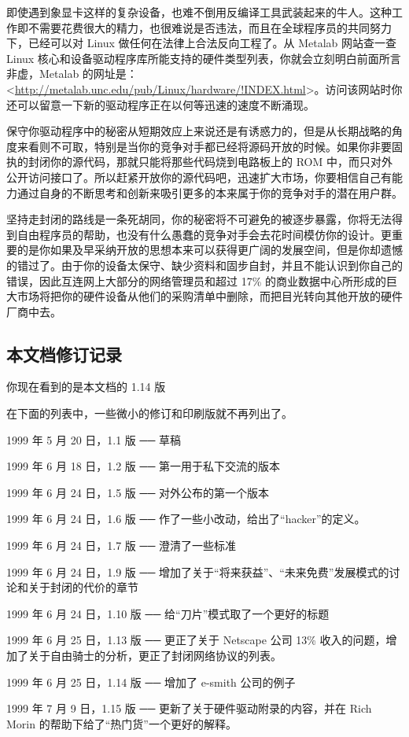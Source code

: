 即使遇到象显卡这样的复杂设备，也难不倒用反编译工具武装起来的牛人。这种工作即不需要花费很大的精力，也很难说是否违法，而且在全球程序员的共同努力下，已经可以对 Linux 做任何在法律上合法反向工程了。从 Metalab 网站查一查 Linux 核心和设备驱动程序库所能支持的硬件类型列表，你就会立刻明白前面所言非虚，Metalab 的网址是： <\url{http://metalab.unc.edu/pub/Linux/hardware/!INDEX.html}>。访问该网站时你还可以留意一下新的驱动程序正在以何等迅速的速度不断涌现。


保守你驱动程序中的秘密从短期效应上来说还是有诱惑力的，但是从长期战略的角度来看则不可取，特别是当你的竞争对手都已经将源码开放的时候。如果你非要固执的封闭你的源代码，那就只能将那些代码烧到电路板上的 ROM 中，而只对外公开访问接口了。所以赶紧开放你的源代码吧，迅速扩大市场，你要相信自己有能力通过自身的不断思考和创新来吸引更多的本来属于你的竞争对手的潜在用户群。


坚持走封闭的路线是一条死胡同，你的秘密将不可避免的被逐步暴露，你将无法得到自由程序员的帮助，也没有什么愚蠢的竞争对手会去花时间模仿你的设计。更重要的是你如果及早采纳开放的思想本来可以获得更广阔的发展空间，但是你却遗憾的错过了。由于你的设备太保守、缺少资料和固步自封，并且不能认识到你自己的错误，因此互连网上大部分的网络管理员和超过 17\% 的商业数据中心所形成的巨大市场将把你的硬件设备从他们的采购清单中删除，而把目光转向其他开放的硬件厂商中去。

\subsection{本文档修订记录}
你现在看到的是本文档的 1.14 版


在下面的列表中，一些微小的修订和印刷版就不再列出了。


1999 年 5 月 20 日，1.1 版  ──  草稿

1999 年 6 月 18 日，1.2 版  ──  第一用于私下交流的版本

1999 年 6 月 24 日，1.5 版  ──  对外公布的第一个版本

1999 年 6 月 24 日，1.6 版  ──  作了一些小改动，给出了“hacker”的定义。

1999 年 6 月 24 日，1.7 版  ──  澄清了一些标准

1999 年 6 月 24 日，1.9 版  ──  增加了关于“将来获益”、“未来免费”发展模式的讨论和关于封闭的代价的章节

1999 年 6 月 24 日，1.10 版  ──  给“刀片”模式取了一个更好的标题

1999 年 6 月 25 日，1.13 版  ──  更正了关于 Netscape 公司 13\% 收入的问题，增加了关于自由骑士的分析，更正了封闭网络协议的列表。

1999 年 6 月 25 日，1.14 版  ──  增加了 e-smith 公司的例子

1999 年 7 月 9 日，1.15 版  ──  更新了关于硬件驱动附录的内容，并在 Rich Morin 的帮助下给了“热门货”一个更好的解释。
